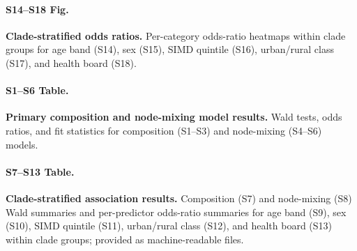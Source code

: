 \documentclass[10pt,letterpaper]{article}
\begin{document}
\paragraph*{S14--S18 Fig.}
{\bf Clade-stratified odds ratios.} Per-category odds-ratio heatmaps within clade groups for age band (S14), sex (S15), SIMD quintile (S16), urban/rural class (S17), and health board (S18).

\paragraph*{S1--S6 Table.}
{\bf Primary composition and node-mixing model results.} Wald tests, odds ratios, and fit statistics for composition (S1--S3) and node-mixing (S4--S6) models.

\paragraph*{S7--S13 Table.}
{\bf Clade-stratified association results.} Composition (S7) and node-mixing (S8) Wald summaries and per-predictor odds-ratio summaries for age band (S9), sex (S10), SIMD quintile (S11), urban/rural class (S12), and health board (S13) within clade groups; provided as machine-readable files.



\end{document}
